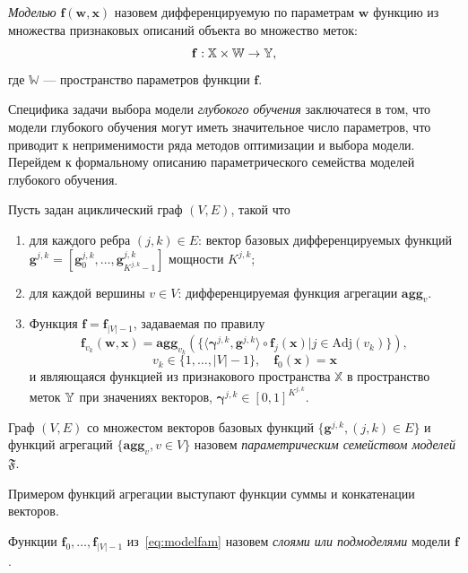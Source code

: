\begin{defin}
\textit{Моделью} $\mathbf{f}(\mathbf{w}, \mathbf{x})$ назовем дифференцируемую по параметрам $\mathbf{w}$ функцию из множества признаковых описаний объекта во множество меток:
\[
    \mathbf{f}: \mathbb{X} \times \mathbb{W} \to \mathbb{Y},
\] 
где $\mathbb{W}$ --- пространство параметров функции $\mathbf{f}$.
\end{defin}
Специфика задачи  выбора модели \textit{глубокого обучения} заключатеся в том, что модели глубокого обучения могут иметь значительное число параметров, что приводит к неприменимости ряда методов оптимизации и выбора модели. 
Перейдем к формальному описанию параметрического семейства моделей глубокого обучения. 
\begin{defin}
Пусть задан ациклический граф $(V,E)$, такой что 
\begin{enumerate}
\item для каждого ребра $(j,k) \in E$: вектор базовых дифференцируемых функций  $\mathbf{g}^{j,k} = [\mathbf{g}^{j,k}_0, \dots, \mathbf{g}^{j,k}_{K^{j,k}-1}]$  мощности $K^{j,k}$;
\item для каждой вершины $v \in V$: дифференцируемая функция агрегации $\textbf{agg}_v$.
\item Функция $\mathbf{f} = \mathbf{f}_{|V|-1}$, задаваемая по правилу 
\begin{equation}
\label{eq:modelfam}
    \mathbf{f}_{v_k}(\mathbf{w}, \mathbf{x}) = \textbf{agg}_{v_k}\left(\{ \langle \boldsymbol{\gamma}^{j,k}, \mathbf{g}^{j,k} \rangle \circ  \mathbf{f}_j(\mathbf{x})| j \in \text{Adj}(v_k)\}\right), 
\end{equation}
\[
v_k \in \{1,\dots,|V|-1\}, \quad \mathbf{f}_0(\mathbf{x}) = \mathbf{x}
\]
и являющаяся функцией из признакового пространства $\mathbb{X}$ в пространство меток $\mathbb{Y}$ при значениях векторов, $\boldsymbol{\gamma}^{j,k} \in [0,1]^{K^{j,k}}$.
\end{enumerate}

Граф $(V, E)$ со множестом векторов базовых функций $\{\mathbf{g}^{j,k}, (j,k) \in E\}$ и функций агрегаций $\{ \textbf{agg}_v, {v \in V}\}$ назовем \textit{параметрическим семейством моделей} $\mathfrak{F}$.
\end{defin}

Примером функций агрегации выступают функции суммы и конкатенации векторов.

\begin{defin}
Функции $\mathbf{f}_0, \dots, \mathbf{f}_{|V|-1}$ из~\eqref{eq:modelfam} назовем \textit{слоями или подмоделями} модели $\mathbf{f}$.
\end{defin}

